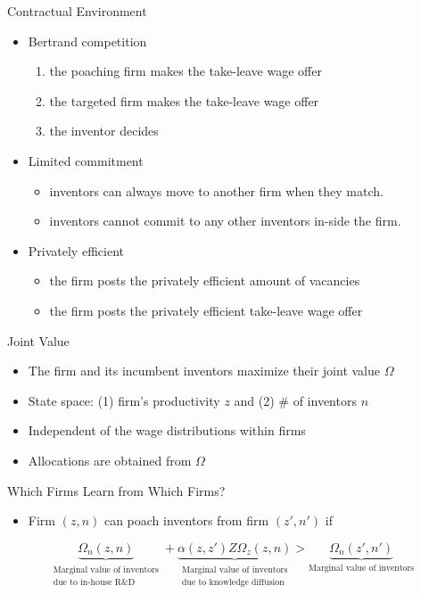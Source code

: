\documentclass{beamer}
\begin{document}
\begin{frame}{Contractual Environment}
  \begin{itemize}
    \setlength\itemsep{3mm}
    \item Bertrand competition
          \begin{enumerate}
            \item {\footnotesize the poaching firm makes the take-leave wage offer}
            \item {\footnotesize the targeted firm makes the take-leave wage offer}
            \item {\footnotesize the inventor decides}
          \end{enumerate}
    \item Limited commitment
          \begin{itemize}
            \item {\footnotesize inventors can always move to another firm when they match.}
            \item {\footnotesize inventors cannot commit to any other inventors in-side the firm.}
          \end{itemize}
    \item Privately efficient
          \begin{itemize}
            \item {\footnotesize the firm posts the privately efficient amount of vacancies}
            \item {\footnotesize the firm posts the privately efficient take-leave wage offer}
          \end{itemize}
  \end{itemize}
\end{frame}

\begin{frame}{Joint Value}
  \begin{itemize}
    \setlength\itemsep{3mm}
    \item The firm and its incumbent inventors maximize their joint value $\Omega$
    \item State space: (1) firm's productivity $z$ and (2) \# of inventors $n$
    \item Independent of the wage distributions within firms
    \item Allocations are obtained from $\Omega$
  \end{itemize}
\end{frame}

\begin{frame}{Which Firms Learn from Which Firms?}
  \begin{itemize}
    \item Firm $(z,n)$ can poach inventors from firm $(z',n')$ if
  \end{itemize}
  \[\underbrace{\Omega_n(z,n)}_{\substack{\text{Marginal value of inventors} \\ \text{due to in-house R\&D}}} + \underbrace{\alpha(z,z') Z\Omega_z(z,n)}_{\substack{\text{Marginal value of inventors} \\ \text{due to knowledge diffusion}}} >  \underbrace{\Omega_n(z',n')}_{\text{Marginal value of inventors}}\]
\end{frame}
\end{document}

